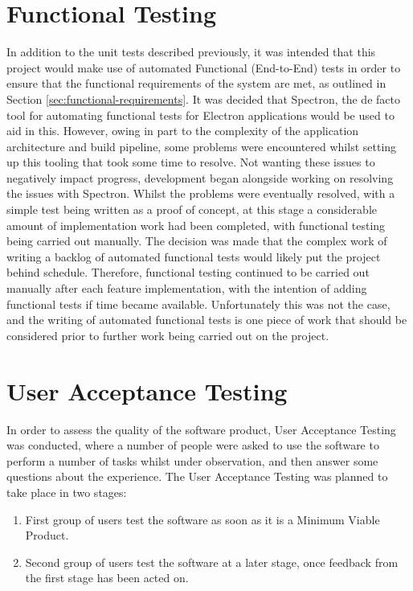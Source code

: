 \section{Functional Testing}
In addition to the unit tests described previously, it was intended that this project would make use of automated Functional (End-to-End) tests in order to ensure that the functional requirements of the system are met, as outlined in Section \ref{sec:functional-requirements}. It was decided that Spectron, the de facto tool for automating functional tests for Electron applications would be used to aid in this. However, owing in part to the complexity of the application architecture and build pipeline, some problems were encountered whilst setting up this tooling that took some time to resolve. Not wanting these issues to negatively impact progress, development began alongside working on resolving the issues with Spectron. Whilst the problems were eventually resolved, with a simple test being written as a proof of concept, at this stage a considerable amount of implementation work had been completed, with functional testing being carried out manually. The decision was made that the complex work of writing a backlog of automated functional tests would likely put the project behind schedule. Therefore, functional testing continued to be carried out manually after each feature implementation, with the intention of adding functional tests if time became available. Unfortunately this was not the case, and the writing of automated functional tests is one piece of work that should be considered prior to further work being carried out on the project.


\section{User Acceptance Testing}
In order to assess the quality of the software product, User Acceptance Testing was conducted, where a number of people were asked to use the software to perform a number of tasks whilst under observation, and then answer some questions about the experience. The User Acceptance Testing was planned to take place in two stages:

\begin{enumerate}
  \item First group of users test the software as soon as it is a Minimum Viable Product.
  \item Second group of users test the software at a later stage, once feedback from the first stage has been acted on.
\end{enumerate}


